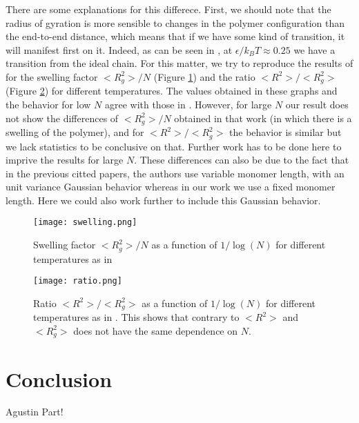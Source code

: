 \documentclass[aps,prl,reprint,groupedaddress]{revtex4-1}
\begin{document}
There are some explanations for this differece. First, we should note that the radius of gyration is more sensible to changes in the polymer configuration than the end-to-end distance, which means that if we have some kind of transition, it will manifest first on it. Indeed, as can be seen in \cite{Witt1996}, at $\epsilon/k_B T \approx 0.25$ we have a transition from the ideal chain. For this matter, we try to reproduce the results of \cite{Grassberger1997} for the swelling factor $<R_g^2>/N$ (Figure \ref{swell}) and the ratio $<R^2>/<R_g^2>$ (Figure \ref{ratio}) for different temperatures. The values obtained in these graphs and the behavior for low $N$ agree with those in \cite{Grassberger1997}. However, for large $N$ our result does not show the differences of $<R_g^2>/N$ obtained in that work (in which there is a swelling of the polymer), and for $<R^2>/<R_g^2>$ the behavior is similar but we lack statistics to be conclusive on that. Further work has to be done here to imprive the results for large $N$. These differences can also be due to the fact that in the previous citted papers, the authors use variable monomer length, with an unit variance Gaussian behavior whereas in our work we use a fixed monomer length. Here we could also work further to include this Gaussian behavior. 

\begin{figure}[ht]
	\texttt{[image: swelling.png]}
	\caption{Swelling factor $<R_g^2>/N$ as a function of $1/\log(N)$ for different temperatures as in \cite{Grassberger1997} \label{swell}}
\end{figure}

\begin{figure}[ht]
	\texttt{[image: ratio.png]}
	\caption{Ratio $<R^2>/<R_g^2>$ as a function of $1/\log(N)$ for different temperatures as in \cite{Grassberger1997}. This shows that contrary to \cite{Smith1975} $<R^2>$ and $<R_g^2>$ does not have the same dependence on $N$. \label{ratio}}
\end{figure}

\section{Conclusion \label{conclusion}}
Agustin Part!


\end{document}

